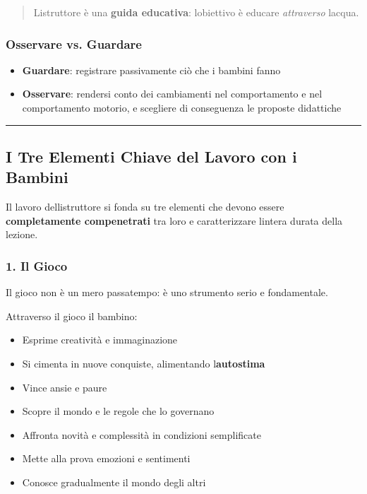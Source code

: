 \documentclass[a4paper,11pt]{article}
\providecommand{\tightlist}{%
  \setlength{\itemsep}{0pt}\setlength{\parskip}{0pt}}
\begin{document}
\begin{quote}
      L\textquotesingle istruttore è una \textbf{guida educativa}:
      l\textquotesingle obiettivo è educare \emph{attraverso}
      l\textquotesingle acqua.
\end{quote}

\subsubsection{Osservare vs. Guardare}\label{osservare-vs.-guardare}

\begin{itemize}
      \tightlist
      \item
            \textbf{Guardare}: registrare passivamente ciò che i bambini fanno
      \item
            \textbf{Osservare}: rendersi conto dei cambiamenti nel comportamento e
            nel comportamento motorio, e scegliere di conseguenza le proposte
            didattiche
\end{itemize}

\begin{center}\rule{0.5\linewidth}{0.5pt}\end{center}

\subsection{I Tre Elementi Chiave del Lavoro con i
      Bambini}\label{i-tre-elementi-chiave-del-lavoro-con-i-bambini}

Il lavoro dell\textquotesingle istruttore si fonda su tre elementi che
devono essere \textbf{completamente compenetrati} tra loro e
caratterizzare l\textquotesingle intera durata della lezione.

\subsubsection{1. Il Gioco}\label{il-gioco}

Il gioco non è un mero passatempo: è uno strumento serio e fondamentale.

Attraverso il gioco il bambino:

\begin{itemize}
      \tightlist
      \item
            Esprime creatività e immaginazione
      \item
            Si cimenta in nuove conquiste, alimentando
            l\textquotesingle{}\textbf{autostima}
      \item
            Vince ansie e paure
      \item
            Scopre il mondo e le regole che lo governano
      \item
            Affronta novità e complessità in condizioni semplificate
      \item
            Mette alla prova emozioni e sentimenti
      \item
            Conosce gradualmente il mondo degli altri
\end{itemize}
\end{document}
